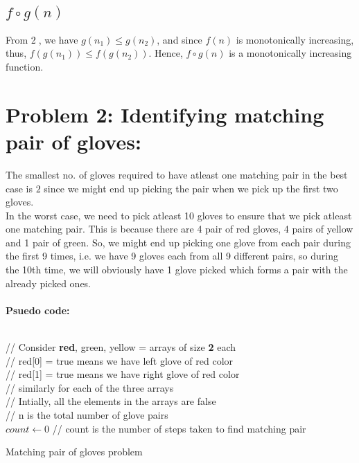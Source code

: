 \documentclass[12pt]{report}
\begin{document}
\subsection{$f \circ g(n)$}
From \textcircled{2}, we have $g(n_{1}) \leq g(n_{2})$, and since $f(n)$ is monotonically increasing, thus, $f(g(n_{1})) \leq f(g(n_{2}))$. Hence, $f \circ g(n)$ is a monotonically increasing function. 

\section{Problem 2: Identifying matching pair of gloves:}
The smallest no. of gloves required to have atleast one matching pair in the best case is $2$ since we might end up picking the pair when we pick up the first two gloves. 
\\ 
In the worst case, we need to pick atleast 10 gloves to ensure that we pick atleast one matching pair. This is because there are 4 pair of red gloves, 4 pairs of yellow and 1 pair of green. So, we might end up picking one glove from each pair during the first 9 times, i.e. we have 9 gloves each from all 9 different pairs, so during the 10th time, we will obviously have 1 glove picked which forms a pair with the already picked ones. 
\\ \\
\textbf{Psuedo code:}
\\ \\ 
\begin{algorithm}[H]
	\SetAlgoLined
	// Consider \textbf{red}, green, yellow = arrays of size \textbf{2} each \\
	// red[0] = true means we have left glove of red color \\
	// red[1] = true means we have right glove of red color \\
	// similarly for each of the three arrays \\
	// Intially, all the elements in the arrays are false \\
	// n is the total number of glove pairs \\
	$count \gets 0$ \;
	// count is the number of steps taken to find matching pair \\
	\caption{Matching pair of gloves problem}	
\end{algorithm}
\end{document}
